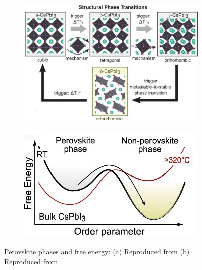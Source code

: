 \begin{figure}[htbp]
    \centering
    \begin{subfigure}[t]{0.56\textwidth} %
        \centering
        \includegraphics[width=\textwidth]{chapters/introduction/image/perovskite_phases.jpeg} %
        \caption{}
        \label{fig:ch2:perovskite_phases}
    \end{subfigure}
    \hfill %
    \begin{subfigure}[t]{0.39\textwidth} %
        \centering
        \includegraphics[width=\textwidth]{chapters/introduction/image/perovskite_free_energy.jpeg} %
        \caption{}
        \label{fig:ch2:perovskite_free_energy}
    \end{subfigure}

    \caption{Perovskite phases and free energy: (a) Reproduced from \cite{Steele2019ThermalFilms} (b) Reproduced from \cite{Steele2021TrojansPerovskite}.}
    \label{fig:ch2:phases_and_free_energy}
\end{figure}

